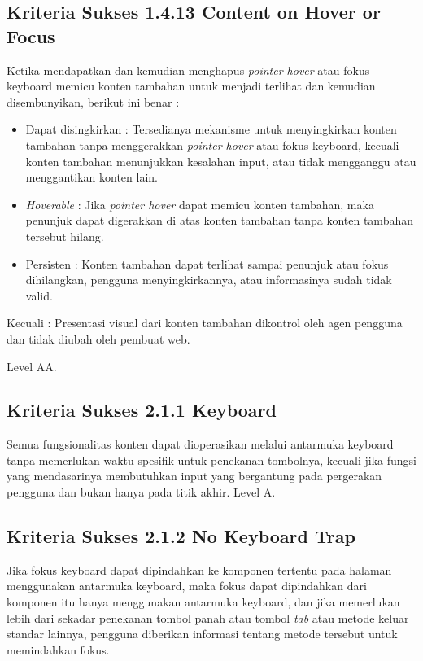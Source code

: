 \subsection{Kriteria Sukses 1.4.13 Content on Hover or Focus}
\label{sec:kriteria_1.4.13}
Ketika mendapatkan dan kemudian menghapus \textit{pointer hover} atau fokus keyboard memicu konten tambahan untuk menjadi terlihat dan kemudian disembunyikan, berikut ini benar :

\begin{itemize}
	\item Dapat disingkirkan : Tersedianya mekanisme untuk menyingkirkan konten tambahan tanpa menggerakkan \textit{pointer hover} atau fokus keyboard, kecuali konten tambahan menunjukkan kesalahan input, atau tidak mengganggu atau menggantikan konten lain.
	\item \textit{Hoverable} : Jika \textit{pointer hover} dapat memicu konten tambahan, maka penunjuk dapat digerakkan di atas konten tambahan tanpa konten tambahan tersebut hilang.
	\item Persisten : Konten tambahan dapat terlihat sampai penunjuk atau fokus dihilangkan, pengguna menyingkirkannya, atau informasinya sudah tidak valid.
\end{itemize}

Kecuali : Presentasi visual dari konten tambahan dikontrol oleh agen pengguna dan tidak diubah oleh pembuat web.

Level AA.

\subsection{Kriteria Sukses 2.1.1 Keyboard}
\label{sec:kriteria_2.1.1}
Semua fungsionalitas konten dapat dioperasikan melalui antarmuka keyboard tanpa memerlukan waktu spesifik untuk penekanan tombolnya, kecuali jika fungsi yang mendasarinya membutuhkan input yang bergantung pada pergerakan pengguna dan bukan hanya pada titik akhir.
Level A.

\subsection{Kriteria Sukses 2.1.2 No Keyboard Trap}
\label{sec:kriteria_2.1.2}
Jika fokus keyboard dapat dipindahkan ke komponen tertentu pada halaman menggunakan antarmuka keyboard, maka fokus dapat dipindahkan dari komponen itu hanya menggunakan antarmuka keyboard, dan jika memerlukan lebih dari sekadar penekanan tombol panah atau tombol \textit{tab} atau metode keluar standar lainnya, pengguna diberikan informasi tentang metode tersebut untuk memindahkan fokus.

